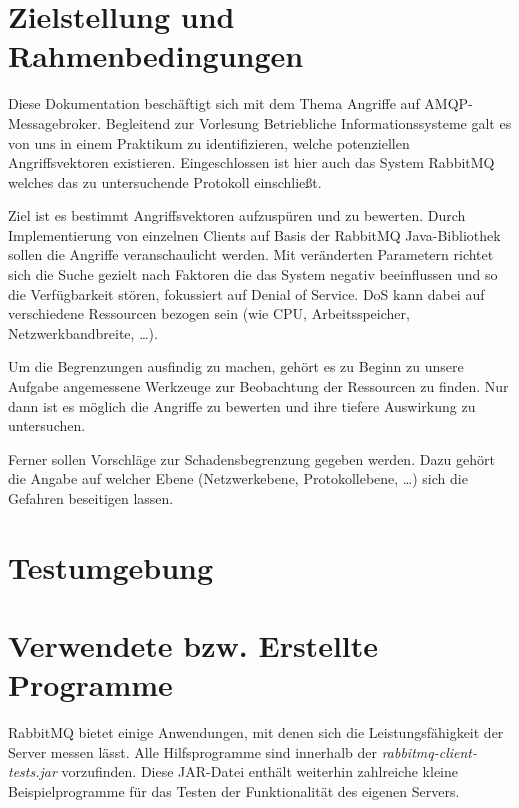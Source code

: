 \documentclass[	a4paper,
			11pt,
			titlepage,
			oneside,
			fleqn,
			listof=totoc,
			parskip,
			chapterprefix=false,
			numbers=noenddot]{scrreprt}
\begin{document}
	
	
	\section*{Zielstellung und Rahmenbedingungen}
	
	Diese Dokumentation beschäftigt sich mit dem Thema \glqq Angriffe auf AMQP-Messagebroker\grqq . Begleitend zur Vorlesung  \glqq Betriebliche Informationssysteme\grqq\/ galt es von uns in einem Praktikum zu identifizieren, welche potenziellen Angriffsvektoren existieren. Eingeschlossen ist hier auch das System \glqq RabbitMQ\grqq\/ welches das zu untersuchende Protokoll einschließt.

Ziel ist es bestimmt Angriffsvektoren aufzuspüren und zu bewerten. Durch Implementierung von einzelnen Clients auf Basis der RabbitMQ Java-Bibliothek sollen die Angriffe veranschaulicht werden.  Mit veränderten Parametern richtet sich die Suche gezielt nach Faktoren die das System negativ beeinflussen und so die Verfügbarkeit stören, fokussiert auf \glqq Denial of Service\grqq. DoS kann dabei auf verschiedene Ressourcen bezogen sein (wie CPU, Arbeitsspeicher, Netzwerkbandbreite, …).

Um die Begrenzungen ausfindig zu machen, gehört es zu Beginn zu unsere Aufgabe angemessene Werkzeuge zur Beobachtung der Ressourcen zu finden. Nur dann ist es möglich die Angriffe zu bewerten und ihre tiefere Auswirkung zu untersuchen.

Ferner sollen Vorschläge zur Schadensbegrenzung gegeben werden. Dazu gehört die Angabe auf welcher Ebene (Netzwerkebene, Protokollebene, …) sich die Gefahren beseitigen lassen.

	\clearpage
	\section*{Testumgebung}
	
	
	\clearpage
	\section*{Verwendete bzw. Erstellte Programme}
	
	RabbitMQ bietet einige Anwendungen, mit denen sich die Leistungsfähigkeit der Server messen lässt. Alle Hilfsprogramme sind innerhalb der \textit{rabbitmq-client-tests.jar} vorzufinden. Diese JAR-Datei enthält weiterhin zahlreiche kleine Beispielprogramme für das Testen der Funktionalität des eigenen Servers. 
	
\end{document}
